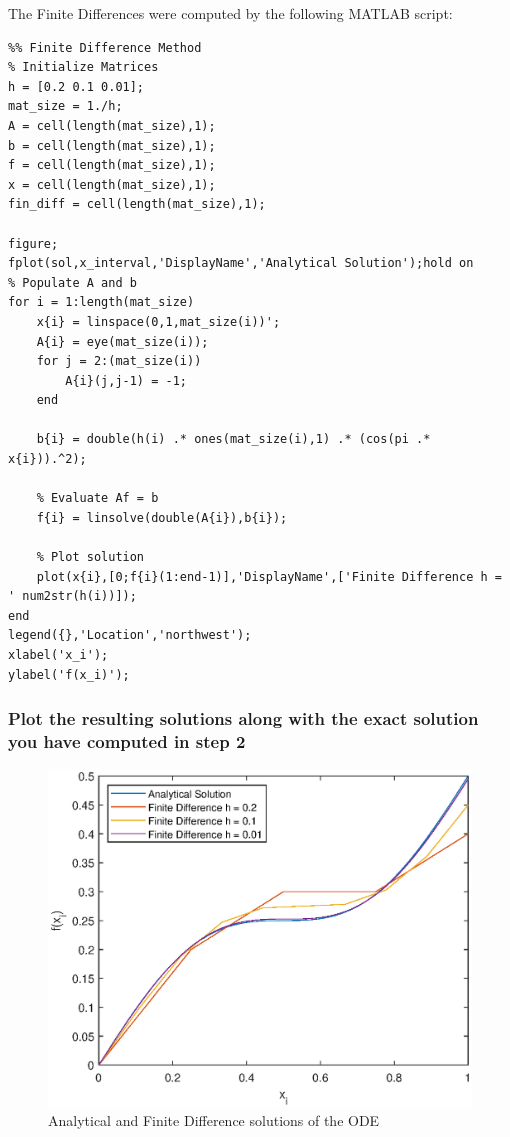 \clearpage
The Finite Differences were computed by the following MATLAB script:
\begin{lstlisting}
%% Finite Difference Method
% Initialize Matrices
h = [0.2 0.1 0.01];
mat_size = 1./h;
A = cell(length(mat_size),1);
b = cell(length(mat_size),1);
f = cell(length(mat_size),1);
x = cell(length(mat_size),1);
fin_diff = cell(length(mat_size),1);

figure;
fplot(sol,x_interval,'DisplayName','Analytical Solution');hold on
% Populate A and b
for i = 1:length(mat_size)
    x{i} = linspace(0,1,mat_size(i))';
    A{i} = eye(mat_size(i));
    for j = 2:(mat_size(i))
        A{i}(j,j-1) = -1;
    end
    
    b{i} = double(h(i) .* ones(mat_size(i),1) .* (cos(pi .* x{i})).^2);
    
    % Evaluate Af = b
    f{i} = linsolve(double(A{i}),b{i});
    
    % Plot solution
    plot(x{i},[0;f{i}(1:end-1)],'DisplayName',['Finite Difference h = ' num2str(h(i))]);
end
legend({},'Location','northwest');
xlabel('x_i');
ylabel('f(x_i)');
\end{lstlisting}
\clearpage
\subsubsection{Plot the resulting solutions along with the exact solution you have computed in step 2}
\begin{figure}[htb!]
    \centering
    \includegraphics[width=.7\linewidth]{./homework2/img/final_FDM.eps}
    \caption{Analytical and Finite Difference solutions of the ODE}
    \label{fig:fin_diff}
\end{figure}